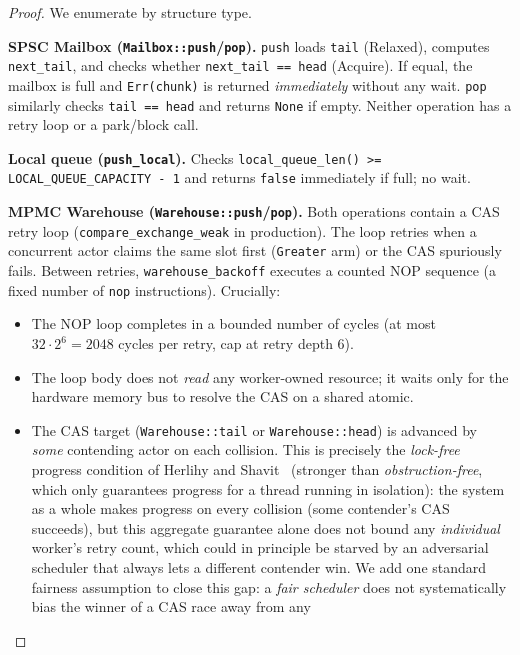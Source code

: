 \documentclass[11pt,a4paper]{report}
\newcommand{\code}[1]{\texttt{#1}}
\begin{document}
\begin{proof}
We enumerate by structure type.

\medskip
\textbf{SPSC Mailbox (\code{Mailbox::push}/\code{pop}).}
\code{push} loads \code{tail} (Relaxed), computes
\code{next\_tail}, and checks whether \code{next\_tail == head}
(Acquire).  If equal, the mailbox is full and \code{Err(chunk)} is
returned \emph{immediately} without any wait.  \code{pop} similarly
checks \code{tail == head} and returns \code{None} if empty.
Neither operation has a retry loop or a park/block call.

\medskip
\textbf{Local queue (\code{push\_local}).}
Checks \code{local\_queue\_len() >= LOCAL\_QUEUE\_CAPACITY - 1}
and returns \code{false} immediately if full; no wait.

\medskip
\textbf{MPMC Warehouse (\code{Warehouse::push}/\code{pop}).}
Both operations contain a CAS retry loop (\code{compare\_exchange\_weak}
in production).  The loop retries when a concurrent actor claims the
same slot first (\code{Greater} arm) or the CAS spuriously fails.
Between retries, \code{warehouse\_backoff} executes a counted NOP
sequence (a fixed number of \code{nop} instructions).  Crucially:
\begin{itemize}
  \item The NOP loop completes in a bounded number of cycles
        (at most $32 \cdot 2^6 = 2048$ cycles per retry, cap at retry
        depth 6).
  \item The loop body does not \emph{read} any worker-owned resource;
        it waits only for the hardware memory bus to resolve the CAS
        on a shared atomic.
  \item The CAS target (\code{Warehouse::tail} or \code{Warehouse::head})
        is advanced by \emph{some} contending actor on each collision.
        This is precisely the \emph{lock-free} progress condition of
        Herlihy and Shavit~\cite{herlihy_shavit2008} (stronger than
        \emph{obstruction-free}, which only guarantees progress for a
        thread running in isolation): the system as a
        whole makes progress on every collision (some contender's CAS
        succeeds), but this aggregate guarantee alone does not bound
        any \emph{individual} worker's retry count, which could in
        principle be starved by an adversarial scheduler that always
        lets a different contender win. We add one standard fairness
        assumption to close this gap: a \emph{fair scheduler} does not
        systematically bias the winner of a CAS race away from any

\end{itemize}
\end{proof}
\end{document}
